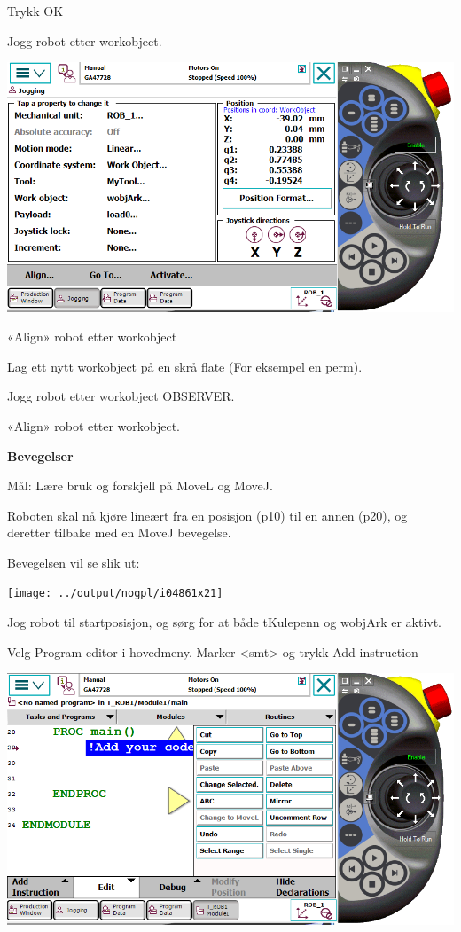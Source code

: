 Trykk OK 

Jogg robot etter workobject.

\includegraphics[width=1\textwidth]{i04861x20}

«Align» robot etter workobject

Lag ett nytt workobject på en skrå flate (For eksempel en perm). 

Jogg robot etter workobject OBSERVER. 

«Align» robot etter workobject.

\textbf{Bevegelser}

Mål: Lære bruk og forskjell på MoveL og MoveJ.

Roboten skal nå kjøre lineært fra en posisjon (p10) til en annen (p20),
og deretter tilbake med en MoveJ bevegelse.

Bevegelsen vil se slik ut:

\texttt{[image: ../output/nogpl/i04861x21]}

Jog robot til startposisjon, og sørg for at både tKulepenn og wobjArk
er aktivt. 

Velg Program editor i hovedmeny. Marker <smt> og trykk Add instruction

\includegraphics[width=1\textwidth]{i04861x22}

